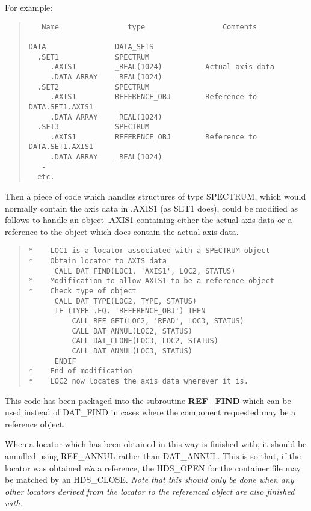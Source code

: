 \documentclass[twoside,11pt]{article}
\begin{document}
For example:
\begin{quote}
\begin{verbatim}
   Name                type                  Comments

DATA                DATA_SETS
  .SET1             SPECTRUM
     .AXIS1         _REAL(1024)          Actual axis data
     .DATA_ARRAY    _REAL(1024)
  .SET2             SPECTRUM
     .AXIS1         REFERENCE_OBJ        Reference to DATA.SET1.AXIS1
     .DATA_ARRAY    _REAL(1024)
  .SET3             SPECTRUM
     .AXIS1         REFERENCE_OBJ        Reference to DATA.SET1.AXIS1
     .DATA_ARRAY    _REAL(1024)
   -
  etc.
\end{verbatim}
\end{quote}

Then a piece of code which handles structures of type SPECTRUM, which
would normally contain the axis data in .AXIS1 (as SET1 does), could be
modified as follows to handle an object .AXIS1 containing either the
actual axis data or a reference to the object which does contain the
actual axis data.

\begin{quote}
\begin{verbatim}
*    LOC1 is a locator associated with a SPECTRUM object
*    Obtain locator to AXIS data
      CALL DAT_FIND(LOC1, 'AXIS1', LOC2, STATUS)
*    Modification to allow AXIS1 to be a reference object
*    Check type of object
      CALL DAT_TYPE(LOC2, TYPE, STATUS)
      IF (TYPE .EQ. 'REFERENCE_OBJ') THEN
          CALL REF_GET(LOC2, 'READ', LOC3, STATUS)
          CALL DAT_ANNUL(LOC2, STATUS)
          CALL DAT_CLONE(LOC3, LOC2, STATUS)
          CALL DAT_ANNUL(LOC3, STATUS)
      ENDIF
*    End of modification
*    LOC2 now locates the axis data wherever it is.
\end{verbatim}
\end{quote}

This code has been packaged into the subroutine \textbf{REF\_FIND} which
can be used instead of DAT\_FIND in cases where the component requested
may be a reference object.

When a locator which has been obtained in this way is finished with, it
should be annulled using REF\_ANNUL rather than DAT\_ANNUL.  This is so
that, if the locator was obtained \emph{via} a reference, the HDS\_OPEN
for the container file may be matched by an HDS\_CLOSE\@.  \emph{Note
that this should only be done when any other locators derived from the
locator to the referenced object are also finished with.}
\end{document}
